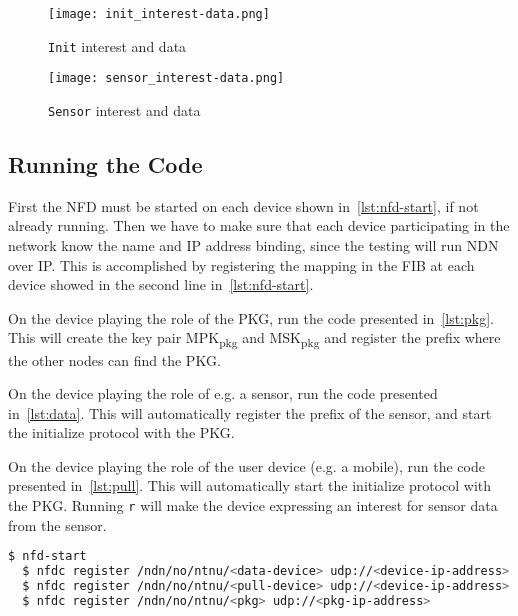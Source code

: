 \begin{figure}[ht]
  \centering
  \texttt{[image: init\_interest-data.png]}
  \caption[Init Interest and Data packet]{\texttt{Init} \gls{interest} and \gls{data}}
  \label{fig:init_interest-data}
\end{figure}

\begin{figure}[ht]
  \centering
  \texttt{[image: sensor\_interest-data.png]}
  \caption[Sensor Interest and Data packet]{\texttt{Sensor} \gls{interest} and \gls{data}}
  \label{fig:sensor_interest-data}
\end{figure}

\subsection{Running the Code}
First the \gls{NFD} must be started on each device shown in~\autoref{lst:nfd-start}, if not already running. 
Then we have to make sure that each device participating in the network know the \gls{name} and \gls{IP} address binding, since the testing will run \gls{NDN} over \gls{IP}.
This is accomplished by registering the mapping in the \gls{FIB} at each device showed in the second line in~\autoref{lst:nfd-start}.

On the device playing the role of the \gls{PKG}, run the code presented in~\autoref{lst:pkg}. 
This will create the key pair MPK\textsubscript{pkg} and MSK\textsubscript{pkg} and register the prefix where the other nodes can find the \gls{PKG}.

On the device playing the role of e.g. a sensor, run the code presented in~\autoref{lst:data}.
This will automatically register the prefix of the sensor, and start the initialize protocol with the \gls{PKG}.

On the device playing the role of the user device (e.g. a mobile), run the code presented in~\autoref{lst:pull}.
This will automatically start the initialize protocol with the \gls{PKG}.
Running \texttt{r} will make the device expressing an \gls{interest} for sensor \gls{data} from the sensor.

\begin{lstlisting}[language=bash, caption={NFD Start}, label={lst:nfd-start}]
  $ nfd-start
  $ nfdc register /ndn/no/ntnu/<data-device> udp://<device-ip-address>
  $ nfdc register /ndn/no/ntnu/<pull-device> udp://<device-ip-address>
  $ nfdc register /ndn/no/ntnu/<pkg> udp://<pkg-ip-address>
\end{lstlisting}

